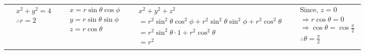 \documentclass[11pt]{extarticle}
\begin{document}
\vspace{-\baselineskip}
\begin{tabularx}{\textwidth}{p{3cm}|p{3cm}|X|p{3cm}}
   $\begin{aligned}
      & x^2+y^2=4 \\
      & \therefore r=2 \\
   \end{aligned}$
   &
   $\begin{aligned}
      & x=r \sin \theta \cos \phi \\
      & y=r \sin \theta \sin \phi \\
      & z=r \cos \theta
   \end{aligned}$
   &
   $\begin{aligned}
      & x^2+y^2+z^2\\
      & = r^2\sin^2\theta\cos^2\phi+r^2\sin^2\theta\sin^2\phi+r^2\cos^2\theta\\
      & = r^2\sin^2\theta\cdot 1+r^2\cos^2\theta\\
      & = r^2
   \end{aligned}$
   &
   $\begin{aligned}
      &\text{Since, \ } z = 0\\
      & \Rightarrow r\cos\theta = 0\\
      & \Rightarrow \cos\theta = \cos\frac{\pi}{2}\\
      & \therefore \theta = \frac{\pi}{2}\\
   \end{aligned}$
\end{tabularx}
\end{document}
